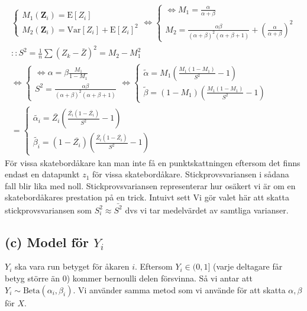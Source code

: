 \documentclass{assignment}
\begin{document}
\begin{align*}
    \left\{\begin{matrix}
        M_1(\mathbf{Z}_i)  = \text{E}[Z_i]
        \\ M_2(\mathbf{Z}_i) = \text{Var}[Z_i]+\text{E}[Z_i]^2
    \end{matrix}\right.
    \Longleftrightarrow \left\{\begin{matrix}
        \Leftrightarrow M_1 = \frac{\alpha}{\alpha+\beta}
        \\ M_2 = \frac{\alpha\beta}{(\alpha+\beta)^2(\alpha+\beta+1)}+(\frac{\alpha}{\alpha+\beta})^2
    \end{matrix}\right.
    \\ :: S^2=\frac{1}{n}\sum (Z_{k}-\bar{Z})^2 = M_2-M_1^2
    \\ \Longleftrightarrow \left\{\begin{matrix}
        \Leftrightarrow \alpha = \beta\frac{M_1}{1-M_1}
        \\ S^2 = \frac{\alpha\beta}{(\alpha+\beta)^2(\alpha+\beta+1)}
    \end{matrix}\right.
    \Longleftrightarrow \left\{\begin{matrix}
        \widetilde{\alpha} = M_1\left(\frac{M_1(1-M_1)}{S^2}-1\right)
        \\ \widetilde{\beta} = (1-M_1)\left(\frac{M_1(1-M_1)}{S^2}-1\right)
    \end{matrix}\right.
    \\ = \left\{\begin{matrix}
        \widetilde{\alpha_i} = \bar{Z_i}\left(\frac{\bar{Z_i}(1-\bar{Z_i})}{S^2}-1\right)
        \\ \widetilde{\beta_i} = (1-\bar{Z_i})\left(\frac{\bar{Z_i}(1-\bar{Z_i})}{S^2}-1\right)
    \end{matrix}\right.
\end{align*}
För vissa skatebordåkare kan man inte få en punktskattningen eftersom det finns endast en
datapunkt $z_1$ för vissa skatebordåkare. Stickprovsvariansen i sådana fall blir lika med noll. Stickprovsvariansen
representerar hur osäkert vi är om en skatebordåkares prestation på en trick. Intuivt sett Vi gör valet
här att skatta stickprovsvariansen som $S_i^2\approx \bar{S^2}$ dvs vi tar medelvärdet av samtliga varianser. 
\subsection*{(c) Model för $Y_i$}
$Y_i$ ska vara run betyget för åkaren $i$. Eftersom $Y_i\in(0,1]$ (varje deltagare får betyg större än 0) kommer bernoulli delen försvinna. Så vi antar att $Y_i\sim \text{Beta}(\alpha_i,\beta_i)$. 
Vi använder samma metod som vi använde för att skatta $\alpha,\beta$ för $X$.
\end{document}
